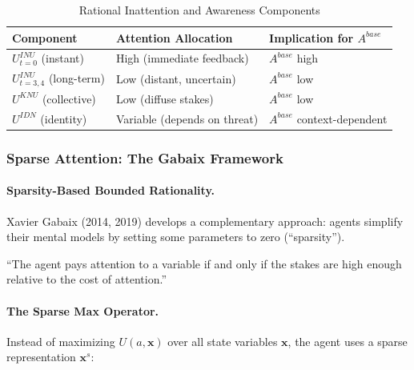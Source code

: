 \begin{table}[htbp]
\centering
\caption{Rational Inattention and Awareness Components}
\label{tab:ri-awareness}
\renewcommand{\arraystretch}{1.3}
\begin{tabular}{@{}lll@{}}
\toprule
\textbf{Component} & \textbf{Attention Allocation} & \textbf{Implication for $A^{base}$} \\
\midrule
$U^{INU}_{t=0}$ (instant) & High (immediate feedback) & $A^{base}$ high \\
$U^{INU}_{t=3,4}$ (long-term) & Low (distant, uncertain) & $A^{base}$ low \\
$U^{KNU}$ (collective) & Low (diffuse stakes) & $A^{base}$ low \\
$U^{IDN}$ (identity) & Variable (depends on threat) & $A^{base}$ context-dependent \\
\bottomrule
\end{tabular}
\end{table}

\subsubsection{Sparse Attention: The Gabaix Framework}
\label{subsubsec:sparse-attention}

\paragraph{Sparsity-Based Bounded Rationality.}
Xavier Gabaix (2014, 2019) develops a complementary approach: agents simplify 
their mental models by setting some parameters to zero (``sparsity'').

\begin{tcolorbox}[colback=blue!5!white, colframe=blue!75!black, title=Gabaix (2014): A Sparsity-Based Model of Bounded Rationality]
``The agent pays attention to a variable if and only if the stakes are 
high enough relative to the cost of attention.''
\end{tcolorbox}

\paragraph{The Sparse Max Operator.}
Instead of maximizing $U(a, \mathbf{x})$ over all state variables $\mathbf{x}$, 
the agent uses a sparse representation $\mathbf{x}^s$:

